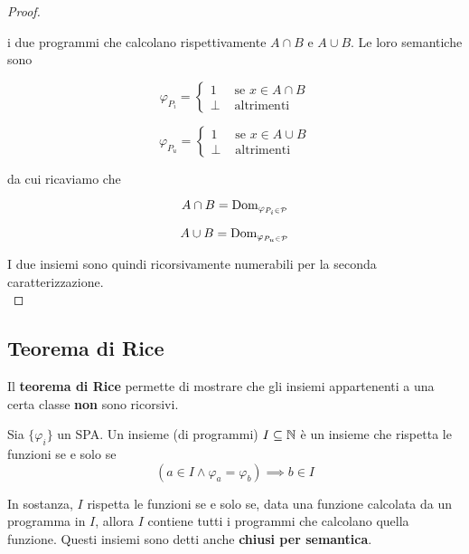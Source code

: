 \begin{proof}
\begin{center}
\begin{minipage}{.45\textwidth}
\begin{tcolorbox}[
				colback=white,
				sharp corners,
				boxrule=.3mm,
				left=20pt,
				top=0pt,
				bottom=0pt,
				title=$P_u$,
				colbacktitle=white,
				coltitle=black
				]
			\end{tcolorbox}
		\end{minipage}
	\end{center}
	i due programmi che calcolano rispettivamente $A \cap B$ e $A \cup B$. Le loro semantiche sono
	\begin{center}
		\begin{minipage}{0.45\textwidth}
			$$ \varphi_{P_i} = \begin{cases}
				1 & \text{ se } x \in A \cap B \\
				\bot & \text{ altrimenti}
			\end{cases}$$
		\end{minipage}
		\begin{minipage}{0.45\textwidth}
			$$ \varphi_{P_u} = \begin{cases}
				1 & \text{ se } x \in A \cup B\\
				\bot & \text{ altrimenti}
			\end{cases}$$
		\end{minipage}
	\end{center}
	da cui ricaviamo che
	\begin{center}
		\begin{minipage}{0.45\textwidth}
			$$ A \cap B = \text{Dom}_{\varphi_{P_i \in \mathcal{P}}}$$
		\end{minipage}
		\begin{minipage}{0.45\textwidth}
			$$ A \cup B = \text{Dom}_{\varphi_{P_u \in \mathcal{P}}}$$
		\end{minipage}
	\end{center}
	I due insiemi sono quindi ricorsivamente numerabili per la seconda caratterizzazione.\\
\end{proof}

\subsection{Teorema di Rice}

Il \textbf{teorema di Rice} permette di mostrare che gli insiemi appartenenti a una certa classe \textbf{non} sono ricorsivi.

Sia $\{\varphi_i\}$ un SPA. Un insieme (di programmi) $I \subseteq \mathbb{N}$ è un insieme che rispetta le funzioni se e solo se
$$ \left(a \in I \wedge \varphi_a = \varphi_b \right) \implies b \in I $$

In sostanza, $I$ rispetta le funzioni se e solo se, data una funzione calcolata da un programma in $I$, allora $I$ contiene tutti i programmi che calcolano quella funzione. Questi insiemi sono detti anche \textbf{chiusi per semantica}.

